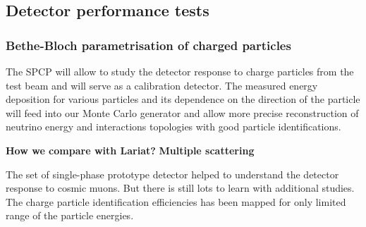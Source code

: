 \subsection{Detector performance tests}

\subsubsection{Bethe-Bloch parametrisation of charged particles}

The SPCP will allow to study the detector response to charge particles from the test beam and will serve as a calibration detector. The measured energy deposition for various particles and its dependence on the direction of the particle will feed into our Monte Carlo generator and allow more precise reconstruction of neutrino energy and interactions topologies with good particle identifications.
 
{\bf How we compare with Lariat?} 
{\bf Multiple scattering}  

The set of single-phase prototype detector helped to understand the detector response to cosmic muons. But there is still lots to learn with additional studies. 
The charge  particle identification efficiencies  has been mapped for only limited range of the particle energies.  


